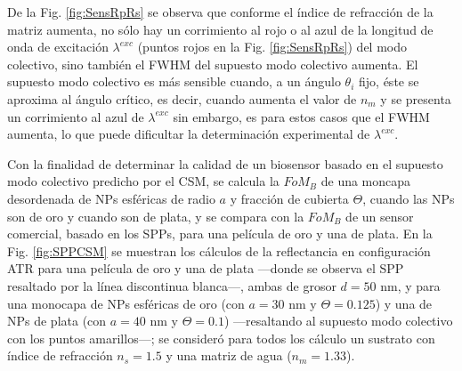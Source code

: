 De la Fig. \ref{fig:SensRpRs} se observa que conforme el índice de refracción de la matriz aumenta, no sólo hay un corrimiento al rojo o al azul de la longitud de onda de excitación $\lambda^{exc}$  (puntos rojos en la Fig. \ref{fig:SensRpRs}) del modo colectivo,  sino también  el FWHM del supuesto modo colectivo aumenta. El supuesto modo colectivo es más sensible cuando, a un ángulo  $\theta_i$ fijo, éste se aproxima al ángulo crítico, es decir, cuando aumenta el valor de $n_m$ y se presenta un corrimiento al azul de $\lambda^{exc}$  sin embargo, es para estos casos que el FWHM aumenta, lo que puede dificultar la determinación experimental de $\lambda^{exc}$. 

Con la finalidad de determinar la calidad de un biosensor basado en el supuesto modo colectivo predicho por el CSM, se calcula la $\textit{FoM}_B$ de una moncapa desordenada de NPs esféricas de radio $a$ y fracción de cubierta $\Theta$, cuando las NPs son de oro y cuando son de plata, y se compara con la $\textit{FoM}_B$ de un sensor comercial, basado en los SPPs, para una película de oro y una de plata. En la Fig. \ref{fig:SPPCSM} se muestran los cálculos de la reflectancia en configuración ATR para una película de oro y una de plata ---donde se observa el SPP resaltado por la línea discontinua blanca---, ambas de grosor $d=50$ nm, y para una monocapa de NPs esféricas de oro (con $a=30$ nm y $\Theta=0.125$) y una de NPs de plata (con $a=40$ nm y $\Theta=0.1$) ---resaltando al supuesto modo colectivo con los puntos amarillos---; se consideró para todos los cálculo un sustrato con índice de refracción $n_s=1.5$ y una matriz de agua ($n_m=1.33$).

